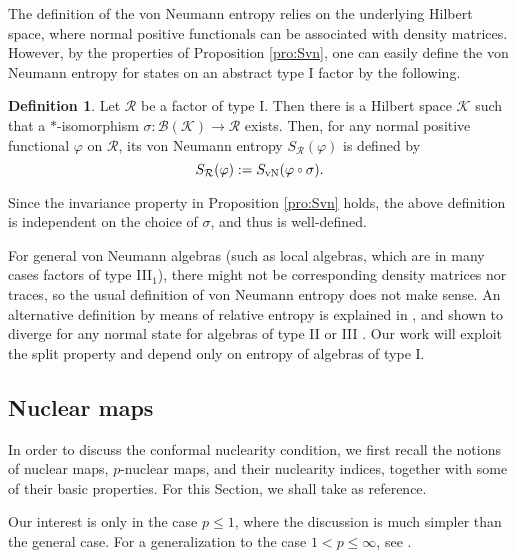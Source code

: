 \documentclass[a4paper,12pt]{article}
\theoremstyle{plain}
\theoremstyle{definition}
\newtheorem{defi}[theo]{Definition}
\theoremstyle{remark}
\newcommand{\compcent}[1]{\vcenter{\hbox{$#1\circ$}}}
\newcommand{\comp}{\mathbin{\mathchoice
{\compcent\scriptstyle}{\compcent\scriptstyle}
{\compcent\scriptscriptstyle}{\compcent\scriptscriptstyle}}}
\newcommand{\Svn}{S_{\rm vN}}
\def\B{{\mathcal B}}
\def\K{{\mathcal K}}
\def\R{{\mathcal R}}
\def\f{\varphi}
\def\R{{\mathcal R}}
\def\s{\sigma}
\begin{document}

The definition of the von Neumann entropy relies on the underlying Hilbert space, where normal positive functionals can be associated with
density matrices. However, by the properties of Proposition \ref{pro:Svn}, one can easily define the von Neumann entropy for states on an abstract type I factor by the following.

\begin{defi}\label{def:SvnI} Let $\R$ be a factor of type I.
  Then there is a Hilbert space $\mathcal{K}$ such that a $*$-isomorphism $\s : \B(\K) \to \R$ exists.
  Then, for any normal positive functional $\f$ on $\R$, its von Neumann entropy $S_\R(\f)$ is defined by
  \[S_\R(\f) := \Svn(\f\comp \s). \] 
\end{defi}

Since the invariance property in Proposition \ref{pro:Svn} holds,
the above definition is independent on the choice of $\s$, and thus is well-defined.


For general von Neumann algebras (such as local algebras, which are in many cases factors of type III$_1$),
there might not be corresponding density matrices nor traces, so the usual definition of von Neumann entropy does not make sense.
An alternative definition by means of relative entropy is explained in \cite[Chapter 6]{ohyapetz},
and shown to diverge for any normal state for algebras of type II or III \cite[Lemma 6.10]{ohyapetz}\cite[Lemma 2.4]{narnhofer94}.
Our work will exploit the split property and depend only on entropy of algebras of type I.




\subsection{Nuclear maps}\label{subsec:lp}

In order to discuss the conformal nuclearity condition, we first recall the notions of nuclear maps, $p$-nuclear maps,
and their nuclearity indices, together with some of their basic properties.
For this Section, we shall take \cite{bdl90a,bdl90b,fop05} as reference.

Our interest is only in the case $p \le 1$, where the discussion is much simpler than the general case.
For a generalization to the case $1 < p \le \infty$, see \cite{fop05}.
\end{document}
